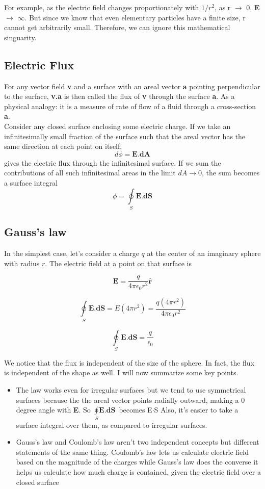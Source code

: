 \documentclass{article}
\begin{document}
	For example, as the electric field changes proportionately with $1/r^2$, as r $\rightarrow$ 0, \textbf{E} $\rightarrow$ $\infty$. But since we know that even elementary particles have a finite size, r cannot get arbitrarily small. Therefore, we can ignore this mathematical singuarity.
	
	\subsection*{Electric Flux}
	For any vector field \textbf{v} and a surface with an areal vector \textbf{a} pointing perpendicular to the surface, \textbf{v.a} is then called the flux of \textbf{v} through the surface \textbf{a}. As a physical analogy: it is a measure of rate of flow of a fluid through a cross-section \textbf{a}.\\
	
	Consider any closed surface enclosing some electric charge. If we take an infinitesimally small fraction of the surface such that the areal vector has the same direction at each point on itself,
	$$ d\phi = \textbf{E.dA}$$
	gives the electric flux through the infinitesimal surface. If we sum the contributions of all such infinitesimal areas in the limit $dA \rightarrow 0$, the sum becomes a surface integral
	$$ \phi = \oint\limits_{S}\textbf{E.dS}$$
	
	\subsection*{Gauss's law}
	In the simplest case, let's consider a charge $q$ at the center of an imaginary sphere with radius $r$. The electric field at a point on that surface is

	$$ \textbf{E} = \frac{q}{4\pi\epsilon_0 r^2} \hat{\textbf{r}} $$
	
		
	$$ \oint\limits_{S}\textbf{E.dS} = E(4\pi r^2) =  \frac{q(4\pi r^2)}{4 \pi \epsilon_0 r^2}$$

	
	$$ \oint\limits_{S}\textbf{E.dS} = \frac{q}{\epsilon_0} $$
	
	We notice that the flux is independent of the size of the sphere. In fact, the flux is independent of the shape as well. I will now summarize some key points.\\
	
	\begin{itemize}
		\item The law works even for irregular surfaces but we tend to use symmetrical surfaces because the the areal vector points radially outward, making a $0$ degree angle with \textbf{E}. So $\oint\limits_{S}\textbf{E.dS}$ becomes E$\cdot$S Also, it's easier to take a surface integral over them, as compared to irregular surfaces.
	
		\item Gauss's law and Coulomb's law aren't two independent concepts but different statements of the same thing. Coulomb's law lets us calculate electric field based on the magnitude of the charges while Gauss's law does the converse \textemdash it helps us calculate how much charge is contained, given the electric field over a closed surface
	\end{itemize}
\end{document}
